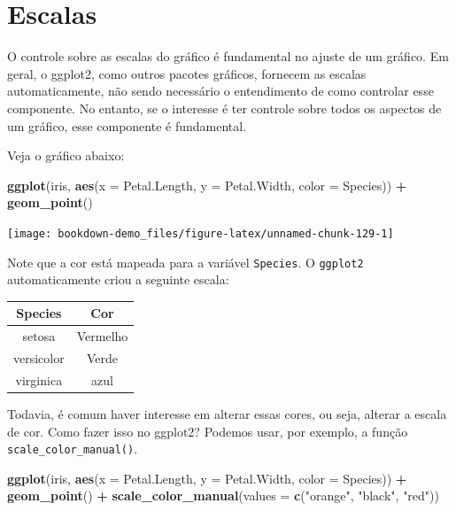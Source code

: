 \documentclass[]{book}
\newenvironment{Shaded}{\begin{snugshade}}{\end{snugshade}}
\newcommand{\KeywordTok}[1]{\textcolor[rgb]{0.13,0.29,0.53}{\textbf{#1}}}
\newcommand{\DataTypeTok}[1]{\textcolor[rgb]{0.13,0.29,0.53}{#1}}
\newcommand{\StringTok}[1]{\textcolor[rgb]{0.31,0.60,0.02}{#1}}
\newcommand{\OperatorTok}[1]{\textcolor[rgb]{0.81,0.36,0.00}{\textbf{#1}}}
\newcommand{\NormalTok}[1]{#1}
\begin{document}
\section{Escalas}\label{escalas}

O controle sobre as escalas do gráfico é fundamental no ajuste de um
gráfico. Em geral, o ggplot2, como outros pacotes gráficos, fornecem as
escalas automaticamente, não sendo necessário o entendimento de como
controlar esse componente. No entanto, se o interesse é ter controle
sobre todos os aspectos de um gráfico, esse componente é fundamental.

Veja o gráfico abaixo:

\begin{Shaded}
\begin{Highlighting}[]
\KeywordTok{ggplot}\NormalTok{(iris, }\KeywordTok{aes}\NormalTok{(}\DataTypeTok{x =}\NormalTok{ Petal.Length, }\DataTypeTok{y =}\NormalTok{ Petal.Width, }\DataTypeTok{color =}\NormalTok{ Species)) }\OperatorTok{+}
\StringTok{  }\KeywordTok{geom_point}\NormalTok{()}
\end{Highlighting}
\end{Shaded}

\begin{center}\texttt{[image: bookdown-demo\_files/figure-latex/unnamed-chunk-129-1]} \end{center}

Note que a cor está mapeada para a variável \texttt{Species}. O
\texttt{ggplot2} automaticamente criou a seguinte escala:

\begin{longtable}[]{@{}cc@{}}
\toprule
Species & Cor\tabularnewline
\midrule
\endhead
setosa & Vermelho\tabularnewline
versicolor & Verde\tabularnewline
virginica & azul\tabularnewline
\bottomrule
\end{longtable}

Todavia, é comum haver interesse em alterar essas cores, ou seja,
alterar a escala de cor. Como fazer isso no ggplot2? Podemos usar, por
exemplo, a função \texttt{scale\_color\_manual()}.

\begin{Shaded}
\begin{Highlighting}[]
\KeywordTok{ggplot}\NormalTok{(iris, }\KeywordTok{aes}\NormalTok{(}\DataTypeTok{x =}\NormalTok{ Petal.Length, }\DataTypeTok{y =}\NormalTok{ Petal.Width, }\DataTypeTok{color =}\NormalTok{ Species)) }\OperatorTok{+}
\StringTok{  }\KeywordTok{geom_point}\NormalTok{() }\OperatorTok{+}
\StringTok{  }\KeywordTok{scale_color_manual}\NormalTok{(}\DataTypeTok{values =} \KeywordTok{c}\NormalTok{(}\StringTok{"orange"}\NormalTok{, }\StringTok{"black"}\NormalTok{, }\StringTok{"red"}\NormalTok{))}
\end{Highlighting}
\end{Shaded}
\end{document}
